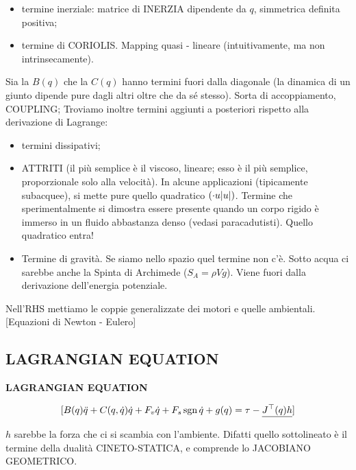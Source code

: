\begin{itemize}
\item termine inerziale: matrice di INERZIA dipendente da $q$, simmetrica definita positiva; 
\item termine di CORIOLIS. Mapping quasi - lineare (intuitivamente, ma non intrinsecamente).

\end{itemize}

Sia la $B(q)$ che la $C(q)$ hanno termini fuori dalla diagonale (la dinamica di un giunto dipende pure dagli altri oltre che da sé stesso). Sorta di accoppiamento, COUPLING; Troviamo inoltre termini aggiunti a posteriori rispetto alla derivazione di Lagrange:

\begin{itemize}

\item termini dissipativi; 
\item ATTRITI (il più semplice è il viscoso, lineare; esso è il più semplice, proporzionale solo alla velocità). In alcune applicazioni (tipicamente subacquee), si mette pure quello quadratico $(\mathord{\cdot}u\lvert u\rvert)$. Termine che sperimentalmente si dimostra essere presente quando un corpo rigido è immerso in un fluido abbastanza denso (vedasi paracadutisti). Quello quadratico entra!
\item Termine di gravità. Se siamo nello spazio quel termine non c'è. Sotto acqua ci sarebbe anche la Spinta di Archimede ($S_A=\rho V g$). Viene fuori dalla derivazione dell'energia potenziale.

\end{itemize}

Nell'RHS mettiamo le coppie generalizzate dei motori e quelle ambientali. [Equazioni di Newton - Eulero]

\subsection{LAGRANGIAN EQUATION}

\begin{defn}{\textbf{LAGRANGIAN EQUATION}}

\[
	[B(q)\ddot{q} + C(q,\dot{q})\dot{q} + F_v\dot{q} + F_s\operatorname{sgn}{\dot{q}} + g(q) = \tau - \underline{J^\top(q)h}]
\]

\end{defn}

$h$ sarebbe la forza che ci si scambia con l'ambiente. Difatti quello sottolineato è il termine della dualità CINETO-STATICA, e comprende lo JACOBIANO GEOMETRICO.


